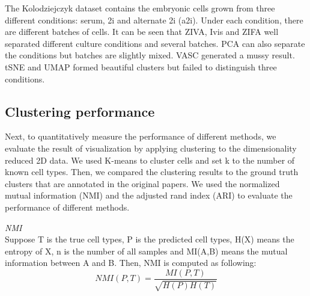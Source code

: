 The Kolodziejczyk dataset contains the embryonic cells grown from three different conditions: serum, 2i and alternate 2i (a2i). Under each condition, there are different batches of cells. It can be seen that ZIVA, Ivis and ZIFA well separated different culture conditions and several batches. PCA can also separate the conditions but batches are slightly mixed. VASC generated a mussy result. tSNE and UMAP formed beautiful clusters but failed to distinguish three conditions.
\subsection{Clustering performance}
Next, to quantitatively measure the performance of different methods, we evaluate the result of visualization by applying clustering to the dimensionality reduced 2D data. We used K-means to cluster cells and set k to the number of known cell types. Then, we compared the clustering results to the ground truth clusters that are annotated in the original papers. We used the normalized mutual information (NMI) and the adjusted rand index (ARI) to evaluate the performance of different methods. 

\vspace{0.5cm}
\noindent\emph{NMI} \\
Suppose T is the true cell types, P is the predicted cell types, H(X) means the entropy of X, n is the number of all samples and MI(A,B) means the mutual information between A and B. Then, NMI is computed as following:
\begin{equation}
    NMI(P, T)=\frac{MI(P, T)}{\sqrt{H(P) H(T)}}
\end{equation}

